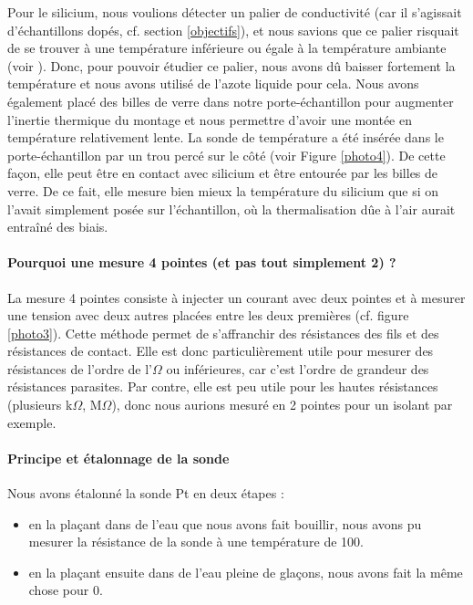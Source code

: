 Pour le silicium, nous voulions détecter un palier de conductivité (car il s'agissait d'échantillons dopés, cf. section \ref{objectifs}),
et nous savions que ce palier risquait de se trouver à une température inférieure ou égale à la température 
ambiante (voir \cite{kittel_introduction_1976}).
Donc, pour pouvoir étudier ce palier, nous avons dû baisser fortement la température et nous avons utilisé de l'azote liquide pour cela.
Nous avons également placé des billes de verre dans notre porte-échantillon pour augmenter l'inertie thermique du montage et nous permettre d'avoir une montée en température relativement lente.
La sonde de température a été insérée dans le porte-échantillon par un trou percé sur le côté (voir Figure \ref{photo4}). De cette façon, elle peut être en contact avec silicium et être entourée par les billes de verre.
De ce fait, elle mesure bien mieux la température du silicium que si on l'avait simplement posée sur l'échantillon,
où la thermalisation dûe à l'air aurait entraîné des biais.


\paragraph{Pourquoi une mesure 4 pointes (et pas tout simplement 2) ?}
La mesure 4 pointes consiste à injecter un courant avec deux pointes et à mesurer une tension avec deux 
autres placées entre les deux premières (cf. figure \ref{photo3}).
Cette méthode permet de s'affranchir des résistances des fils et des résistances de contact.
Elle est donc particulièrement utile pour mesurer des résistances de l'ordre de l'$\Omega$ ou inférieures, car c'est l'ordre de grandeur des résistances parasites.
Par contre, elle est peu utile pour les hautes résistances (plusieurs k$\Omega$, M$\Omega$), donc nous aurions mesuré en 2 pointes pour un isolant par exemple.


\paragraph{Principe et étalonnage de la sonde}
Nous avons étalonné la sonde Pt en deux étapes :

\begin{itemize}
  \item en la plaçant dans de l'eau que nous avons fait bouillir, nous avons pu mesurer la résistance de la sonde à une température de 100\celsius{}.
  \item en la plaçant ensuite dans de l'eau pleine de glaçons, nous avons fait la même chose pour 0\celsius{}.
\end{itemize}


